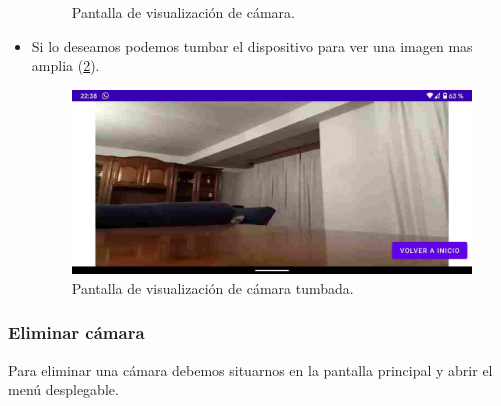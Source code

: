 \begin{itemize}
\begin{figure}[h!]
	\caption{Pantalla de visualización de cámara.}
	\label{fig:appmanual10}
\end{figure}
\item
	Si lo deseamos podemos tumbar el dispositivo para ver una imagen mas amplia (\ref{fig:appmanual11}).
\begin{figure}[h!]
	\centering
	\includegraphics[width=0.9\linewidth]{img/manualuse7}
	\caption{Pantalla de visualización de cámara tumbada.}
	\label{fig:appmanual11}
\end{figure}
\end{itemize}

\subsubsection{Eliminar cámara}

Para eliminar una cámara debemos situarnos en la pantalla principal y abrir el menú desplegable.

